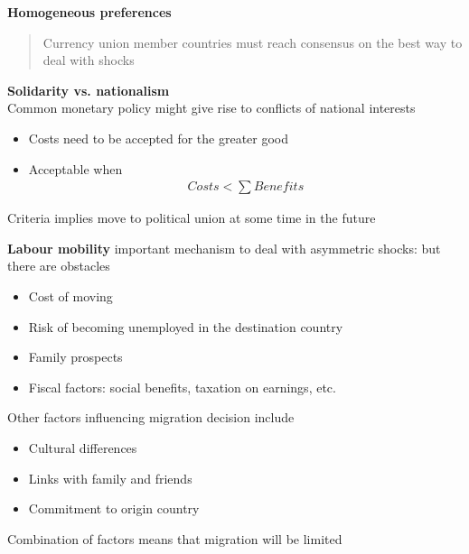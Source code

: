 \documentclass{beamer}
\begin{document}
\begin{frame}
  \textbf{Homogeneous preferences}
  \begin{quote}
    Currency union member countries must reach consensus on the best way to deal with shocks
  \end{quote}
    \medskip
  \textbf{Solidarity vs. nationalism}\\
   Common monetary policy might give rise to conflicts of national interests
  \begin{itemize}
    \item Costs need to be accepted for the greater good 
    \item Acceptable when
    \begin{align*}
      Costs < \sum Benefits
    \end{align*}    
  \end{itemize}
  Criteria implies move to political union at some time in the future  
\end{frame}

\begin{frame}
  \textbf{Labour mobility} important mechanism to deal with asymmetric shocks: but there are obstacles
  \medskip
\begin{itemize}
  \item Cost of moving 
  \item Risk of becoming unemployed in the destination country
  \item Family prospects
  \item Fiscal factors: social benefits, taxation on earnings, etc.
\end{itemize}
\end{frame}

\begin{frame}
  Other factors influencing migration decision include  
  \begin{itemize}
    \item Cultural differences
    \item Links with family and friends
    \item Commitment to origin country
  \end{itemize}
  \medskip
  Combination of factors means that migration will be limited
\end{frame}
\end{document}
